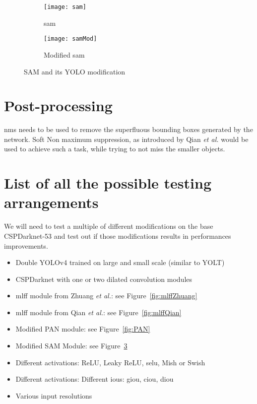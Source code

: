 \begin{figure}[H]
	\centering
	\begin{subfigure}[b]{0.4\textwidth}
		\centering
		\texttt{[image: sam]}
		\caption{\gls{sam}}
		\label{fig:samnorm}
	\end{subfigure}
	\begin{subfigure}[b]{0.4\textwidth}
		\centering
		\texttt{[image: samMod]}
		\caption{Modified \gls{sam}}
		\label{fig:samod}
	\end{subfigure}
	\caption{SAM and its YOLO modification}
	\label{fig:SAM}
\end{figure}

\section{Post-processing}
\gls{nms} needs to be used to remove the superfluous bounding boxes generated by the network. Soft Non maximum suppression, as introduced by Qian \textit{et al.} \cite{qianAl} would be used to achieve such a task, while trying to not miss the smaller objects.


\section{List of all the possible testing arrangements}
We will need to test a multiple of different modifications on the base CSPDarknet-53 and test out if those modifications results in performances improvements.
\begin{itemize}
	\item Double YOLOv4 trained on large and small scale (similar to YOLT\cite{yolt})
	\item CSPDarknet with one or two dilated convolution modules
	\item \gls{mlff} module from Zhuang \textit{et al.}: see Figure~\ref{fig:mlffZhuang}
	\item \gls{mlff} module from Qian \textit{et al.}: see Figure~\ref{fig:mlffQian}
	\item Modified PAN module: see Figure~\ref{fig:PAN}
	\item Modified SAM Module: see Figure~\ref{fig:SAM}
	\item Different activations: ReLU, Leaky ReLU, \gls{selu}, Mish or Swish
	\item Different activations: Different \glspl{iou}: \gls{giou}, \gls{ciou}, \gls{diou} 
	\item Various input resolutions 
\end{itemize}


